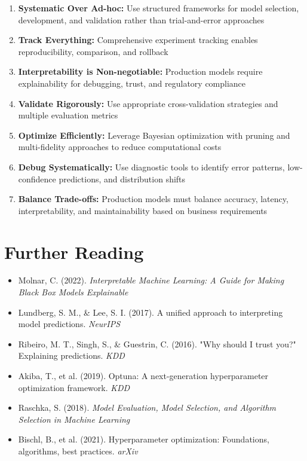 \begin{enumerate}
    \item \textbf{Systematic Over Ad-hoc:} Use structured frameworks for model selection, development, and validation rather than trial-and-error approaches

    \item \textbf{Track Everything:} Comprehensive experiment tracking enables reproducibility, comparison, and rollback

    \item \textbf{Interpretability is Non-negotiable:} Production models require explainability for debugging, trust, and regulatory compliance

    \item \textbf{Validate Rigorously:} Use appropriate cross-validation strategies and multiple evaluation metrics

    \item \textbf{Optimize Efficiently:} Leverage Bayesian optimization with pruning and multi-fidelity approaches to reduce computational costs

    \item \textbf{Debug Systematically:} Use diagnostic tools to identify error patterns, low-confidence predictions, and distribution shifts

    \item \textbf{Balance Trade-offs:} Production models must balance accuracy, latency, interpretability, and maintainability based on business requirements
\end{enumerate}

\section{Further Reading}

\begin{itemize}
    \item Molnar, C. (2022). \textit{Interpretable Machine Learning: A Guide for Making Black Box Models Explainable}
    \item Lundberg, S. M., \& Lee, S. I. (2017). A unified approach to interpreting model predictions. \textit{NeurIPS}
    \item Ribeiro, M. T., Singh, S., \& Guestrin, C. (2016). "Why should I trust you?" Explaining predictions. \textit{KDD}
    \item Akiba, T., et al. (2019). Optuna: A next-generation hyperparameter optimization framework. \textit{KDD}
    \item Raschka, S. (2018). \textit{Model Evaluation, Model Selection, and Algorithm Selection in Machine Learning}
    \item Bischl, B., et al. (2021). Hyperparameter optimization: Foundations, algorithms, best practices. \textit{arXiv}
\end{itemize}

